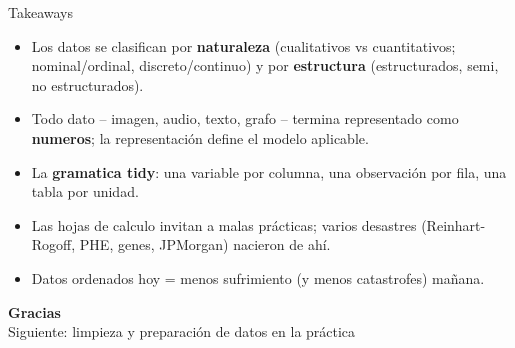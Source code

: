 \documentclass[aspectratio=169]{beamer}
\begin{document}
\begin{frame}{Takeaways}
  \begin{itemize}
    \item Los datos se clasifican por \textbf{naturaleza} (cualitativos vs
          cuantitativos; nominal/ordinal, discreto/continuo) y por
          \textbf{estructura} (estructurados, semi, no estructurados).
    \item Todo dato -- imagen, audio, texto, grafo -- termina representado como
          \textbf{numeros}; la representaci\'on define el modelo aplicable.
    \item La \textbf{gramatica tidy}: una variable por columna, una observaci\'on
          por fila, una tabla por unidad.
    \item Las hojas de calculo invitan a malas pr\'acticas; varios desastres
          (Reinhart-Rogoff, PHE, genes, JPMorgan) nacieron de ah\'i.
    \item Datos ordenados hoy = menos sufrimiento (y menos catastrofes) ma\~nana.
  \end{itemize}
\end{frame}

\begin{frame}[plain]
  \molinaBanner
  \vfill
  \begin{center}
    {\color{molMorado}\Large\bfseries Gracias}\\[0.4em]
    {\color{molTeal} Siguiente: limpieza y preparaci\'on de datos en la pr\'actica}
  \end{center}
  \vfill\vspace{1.0cm}
  \molinaLogos
\end{frame}
\end{document}
